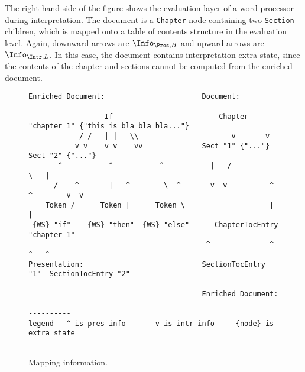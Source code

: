 The right-hand side of the figure shows the evaluation layer of a word processor during interpretation. The document is a \verb|Chapter| node containing two \verb|Section| children, which is mapped onto a table of contents structure in the evaluation level. Again, downward arrows are $\Info_{\Pres,H}$ and upward arrows are $\Info_{\Intr,L}$.  In this case, the document contains interpretation extra state, since the contents of the chapter and sections cannot be computed from the enriched document.  

\begin{figure}
\begin{center}
\begin{center}
\begin{footnotesize}
\begin{verbatim}
Enriched Document:                       Document:                                                                                            
                                                                                            
                  If                         Chapter "chapter 1" {"this is bla bla bla..."} 
            / /   | |   \\                      v       v                                     
           v v    v v    vv              Sect "1" {"..."}     Sect "2" {"..."}                
       ^           ^           ^           |   /                    \   |                            
      /    ^       |   ^        \  ^       v  v          ^  ^        v  v                          
    Token /      Token |      Token \                    |  |                             
 {WS} "if"    {WS} "then"  {WS} "else"      ChapterTocEntry "chapter 1"                     
                                          ^              ^                 ^   ^              
Presentation:                            SectionTocEntry "1"  SectionTocEntry "2"           
                                                                                            
                                         Enriched Document:                                 

----------                                                                        
legend   ^ is pres info       v is intr info     {node} is extra state            
                                                                                  
\end{verbatim}  
\end{footnotesize}                                                                  
\end{center}                                                                      
\caption{Mapping information.}\label{info}                          
\end{center}                                                                      
\end{figure}

